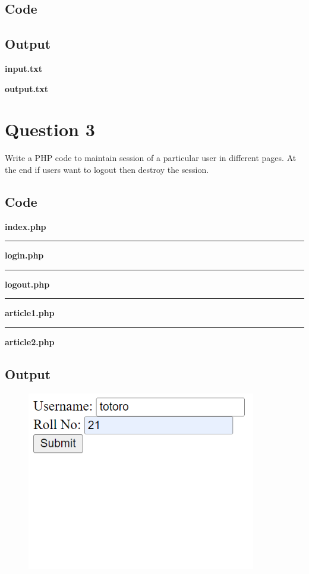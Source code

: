 \documentclass{article}
\begin{document}
\subsection*{Code}

\newpage
\subsection*{Output}
\textbf{input.txt}

\textbf{output.txt}


\newpage
\section*{Question 3}
Write a PHP code to maintain session of a particular user in different pages.
At the end if users want to logout then destroy the session.
\subsection*{Code}
\textbf{index.php}

\par\noindent\rule{\textwidth}{0.4pt}
\textbf{login.php}

\par\noindent\rule{\textwidth}{0.4pt}
\textbf{logout.php}

\par\noindent\rule{\textwidth}{0.4pt}
\textbf{article1.php}

\par\noindent\rule{\textwidth}{0.4pt}
\textbf{article2.php}

\newpage
\subsection*{Output}
\begin{figure}[H]
  \centering
  \includegraphics[width=10cm]{3/out.png}
\end{figure}
\end{document}
